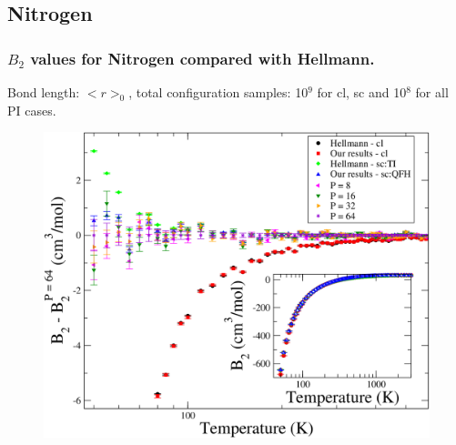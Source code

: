 \documentclass[xcolor=svgnames]{beamer}
\begin{document}
        \subsection{Nitrogen}
            \begin{frame}
                \frametitle{$B_2$ values for Nitrogen compared with Hellmann.}
                \begin{center}Bond length: $< r >_0$, total configuration samples: 10$^9$ for cl, sc and 10$^8$ for all PI cases.\end{center}
                \begin{figure}[!htbp]
                    \centering
                    \includegraphics[scale=0.15,keepaspectratio]{B2AllDiffPICB.png}
                \end{figure}
            \end{frame}
\end{document}
